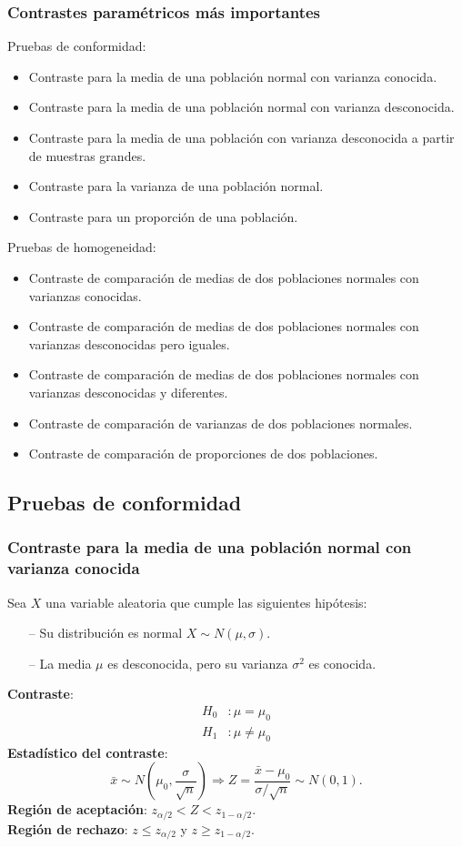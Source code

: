 \begin{frame}
\frametitle{Contrastes paramétricos más importantes}
Pruebas de conformidad:
\begin{itemize}
\item Contraste para la media de una población normal con varianza conocida.
\item Contraste para la media de una población normal con varianza desconocida.
\item Contraste para la media de una población con varianza desconocida a partir de muestras grandes.
\item Contraste para la varianza de una población normal. 
\item Contraste para un proporción de una población.
\end{itemize}
Pruebas de homogeneidad:
\begin{itemize}
\item Contraste de comparación de medias de dos poblaciones normales con varianzas conocidas.
\item Contraste de comparación de medias de dos poblaciones normales con varianzas desconocidas pero iguales.
\item Contraste de comparación de medias de dos poblaciones normales con varianzas desconocidas y diferentes.
\item Contraste de comparación de varianzas de dos poblaciones normales.
\item Contraste de comparación de proporciones de dos poblaciones.
\end{itemize}
\end{frame}


\subsection{Pruebas de conformidad}
\begin{frame}
\frametitle{Contraste para la media de una población normal con varianza conocida}
Sea $X$ una variable aleatoria que cumple las siguientes hipótesis:
\begin{itemize}
\item[--] Su distribución es normal $X\sim N(\mu,\sigma)$.
\item[--] La media $\mu$ es desconocida, pero su varianza $\sigma^2$ es conocida.
\end{itemize}
\textbf{Contraste}:
\begin{align*} 
H_0 &: \mu=\mu_0\\
H_1 &: \mu\neq \mu_0
\end{align*}
\textbf{Estadístico del contraste}:
\[
\bar x\sim N\left(\mu_0,\frac{\sigma}{\sqrt{n}}\right) \Rightarrow Z=\frac{\bar x-\mu_0}{\sigma/\sqrt{n}}\sim N(0,1).
\]
\textbf{Región de aceptación}: $z_{\alpha/2}< Z < z_{1-\alpha/2}$.\\
\textbf{Región de rechazo}: $z\leq z_{\alpha/2}$ y $z\geq z_{1-\alpha/2}$.
\end{frame}


